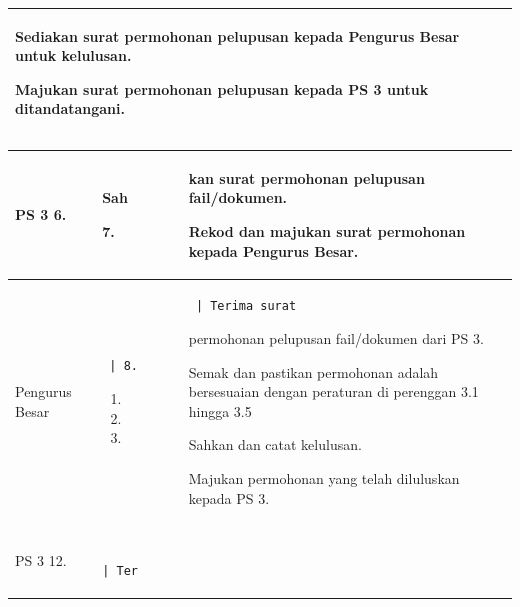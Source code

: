 \documentclass[
]{article}
\begin{document}
\begin{longtable}[]{@{}lll@{}}
\begin{minipage}[t]{0.30\columnwidth}
Sediakan surat permohonan pelupusan kepada Pengurus Besar untuk
kelulusan.

Majukan surat permohonan pelupusan kepada PS 3 untuk
ditandatangani.\strut
\end{minipage}\tabularnewline
\bottomrule
\end{longtable}

\begin{longtable}[]{@{}lll@{}}
\toprule
\begin{minipage}[b]{0.30\columnwidth}\raggedright
PS 3 \textbar{} 6.\strut
\end{minipage} & \begin{minipage}[b]{0.30\columnwidth}\raggedright
Sah

7.\strut
\end{minipage} & \begin{minipage}[b]{0.30\columnwidth}\raggedright
kan surat permohonan pelupusan fail/dokumen.

Rekod dan majukan surat permohonan kepada Pengurus Besar.\strut
\end{minipage}\tabularnewline
\midrule
\endhead
\begin{minipage}[t]{0.30\columnwidth}\raggedright
Pengurus Besar\strut
\end{minipage} & \begin{minipage}[t]{0.30\columnwidth}\raggedright
\begin{verbatim}
 | 8.
\end{verbatim}

\begin{enumerate}
\def\labelenumi{\arabic{enumi}.}
\setcounter{enumi}{8}
\item
\item
\item
\end{enumerate}\strut
\end{minipage} & \begin{minipage}[t]{0.30\columnwidth}\raggedright
\begin{verbatim}
 | Terima surat
\end{verbatim}

permohonan pelupusan fail/dokumen dari PS 3.

Semak dan pastikan permohonan adalah bersesuaian dengan peraturan di
perenggan 3.1 hingga 3.5

Sahkan dan catat kelulusan.

Majukan permohonan yang telah diluluskan kepada PS 3.\strut
\end{minipage}\tabularnewline
\begin{minipage}[t]{0.30\columnwidth}\raggedright
PS 3 \textbar{} 12.\strut
\end{minipage} & \begin{minipage}[t]{0.30\columnwidth}\raggedright
\begin{verbatim}
              | Ter
\end{verbatim}


\end{minipage}
\end{longtable}
\end{document}
